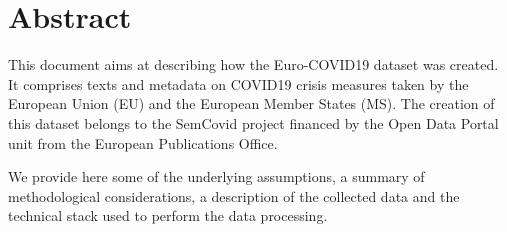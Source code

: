 \section*{Abstract}

This document aims at describing how the Euro-COVID19 dataset was created. It comprises texts and metadata on COVID19 crisis measures taken by the European Union (EU) and the European Member States (MS). The creation of this dataset belongs to the SemCovid project financed by the Open Data Portal unit from the European Publications Office.

We provide here some of the underlying assumptions, a summary of methodological considerations, a description of the collected data and the technical stack used to perform the data processing. 